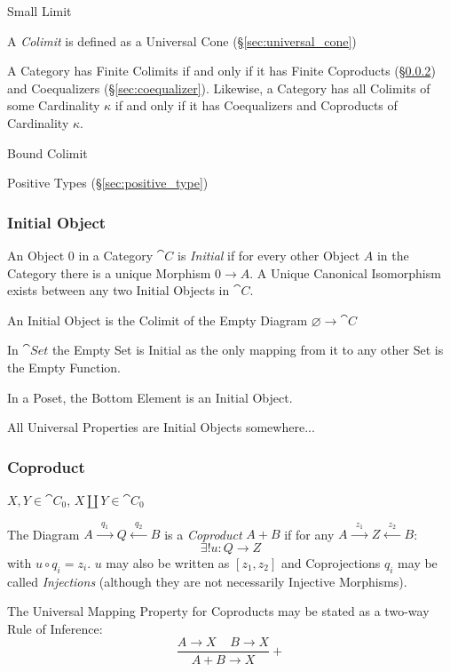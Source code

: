 Small Limit

A \emph{Colimit} is defined as a Universal Cone
(\S\ref{sec:universal_cone})

A Category has Finite Colimits if and only if it has Finite Coproducts
(\S\ref{sec:coproduct}) and Coequalizers (\S\ref{sec:coequalizer}).
Likewise, a Category has all Colimits of some Cardinality $\kappa$ if
and only if it has Coequalizers and Coproducts of Cardinality
$\kappa$.

Bound Colimit %

Positive Types (\S\ref{sec:positive_type})



\subsubsection{Initial Object}\label{sec:initial_object}

An Object $0$ in a Category $\cat{C}$ is \emph{Initial} if for
every other Object $A$ in the Category there is a unique Morphism $0
\rightarrow A$. A Unique Canonical Isomorphism exists between any two
Initial Objects in $\cat{C}$.

An Initial Object is the Colimit of the Empty Diagram $\varnothing
\rightarrow \cat{C}$

In $\cat{Set}$ the Empty Set is Initial as the only mapping from it
to any other Set is the Empty Function.

In a Poset, the Bottom Element is an Initial Object.

All Universal Properties are Initial Objects somewhere...



\subsubsection{Coproduct}\label{sec:coproduct}

$X,Y \in \cat{C}_0$, $X \amalg Y \in \cat{C}_0$

The Diagram $A \xrightarrow{\;\;q_1\;\;} Q \xleftarrow{\;\;q_2\;\;} B$
is a \emph{Coproduct} $A + B$ if for any $A \xrightarrow{\;\;z_1\;\;}
Z \xleftarrow{\;\;z_2\;\;} B$:
\[
  \exists!u : Q \rightarrow Z
\]
with $u \circ q_i = z_i$. $u$ may also be written as $[ z_1, z_2 ]$
and Coprojections $q_i$ may be called \emph{Injections} (although they
are not necessarily Injective Morphisms).

The Universal Mapping Property for Coproducts may be stated as a
two-way Rule of Inference:
\[
  {
    \frac{A \rightarrow X \;\;\;\; B \rightarrow X}
    {A + B \rightarrow X}
  }+
\]

